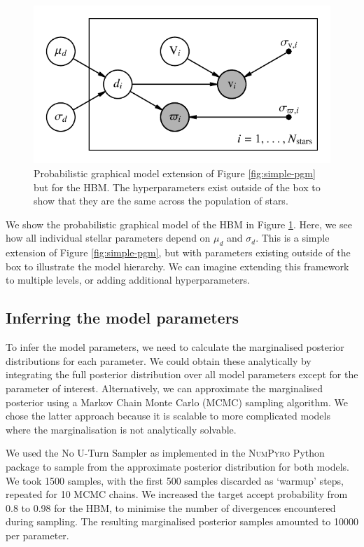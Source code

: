\begin{figure}[tb]
    \centering
    \includegraphics{figures/hbm-pgm.pdf}
    \caption{Probabilistic graphical model extension of Figure \ref{fig:simple-pgm} but for the HBM. The hyperparameters exist outside of the box to show that they are the same across the population of stars.}
    \label{fig:hbm-pgm}
\end{figure}

We show the probabilistic graphical model of the HBM in Figure \ref{fig:hbm-pgm}. Here, we see how all individual stellar parameters depend on \(\mu_d\) and \(\sigma_d\). This is a simple extension of Figure \ref{fig:simple-pgm}, but with parameters existing outside of the box to illustrate the model hierarchy. We can imagine extending this framework to multiple levels, or adding additional hyperparameters.

\subsection{Inferring the model parameters}\label{sec:hbm-inf}

To infer the model parameters, we need to calculate the marginalised posterior distributions for each parameter. We could obtain these analytically by integrating the full posterior distribution over all model parameters except for the parameter of interest. Alternatively, we can approximate the marginalised posterior using a Markov Chain Monte Carlo (MCMC) sampling algorithm. We chose the latter approach because it is scalable to more complicated models where the marginalisation is not analytically solvable.

We used the No U-Turn Sampler \citep[NUTS;][]{Hoffman.Gelman2014} as implemented in the \textsc{NumPyro} Python package \citep{Phan.Pradhan.ea2019,Bingham.Chen.ea2019} to sample from the approximate posterior distribution for both models. We took 1500 samples, with the first 500 samples discarded as `warmup' steps, repeated for 10 MCMC chains. We increased the target accept probability from 0.8 to 0.98 for the HBM, to minimise the number of divergences encountered during sampling. The resulting marginalised posterior samples amounted to \num{10000} per parameter.

